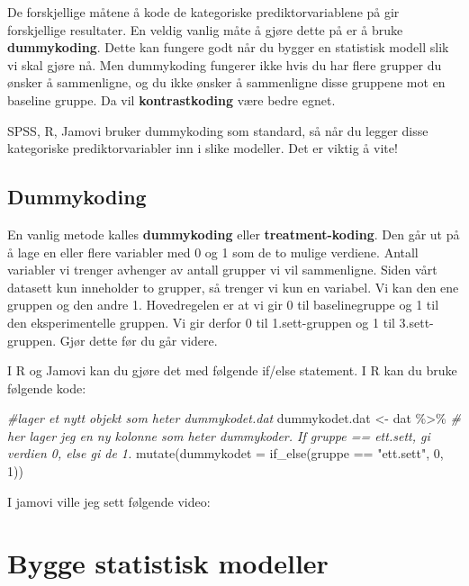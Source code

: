 \documentclass[
]{book}
\newenvironment{Shaded}{\begin{snugshade}}{\end{snugshade}}
\newcommand{\AttributeTok}[1]{\textcolor[rgb]{0.77,0.63,0.00}{#1}}
\newcommand{\CommentTok}[1]{\textcolor[rgb]{0.56,0.35,0.01}{\textit{#1}}}
\newcommand{\DecValTok}[1]{\textcolor[rgb]{0.00,0.00,0.81}{#1}}
\newcommand{\FunctionTok}[1]{\textcolor[rgb]{0.00,0.00,0.00}{#1}}
\newcommand{\NormalTok}[1]{#1}
\newcommand{\OtherTok}[1]{\textcolor[rgb]{0.56,0.35,0.01}{#1}}
\newcommand{\SpecialCharTok}[1]{\textcolor[rgb]{0.00,0.00,0.00}{#1}}
\newcommand{\StringTok}[1]{\textcolor[rgb]{0.31,0.60,0.02}{#1}}
\begin{document}
De forskjellige måtene å kode de kategoriske prediktorvariablene på gir forskjellige resultater. En veldig vanlig måte å gjøre dette på er å bruke \textbf{dummykoding}. Dette kan fungere godt når du bygger en statistisk modell slik vi skal gjøre nå. Men dummykoding fungerer ikke hvis du har flere grupper du ønsker å sammenligne, og du ikke ønsker å sammenligne disse gruppene mot en baseline gruppe. Da vil \textbf{kontrastkoding} være bedre egnet.

SPSS, R, Jamovi bruker dummykoding som standard, så når du legger disse kategoriske prediktorvariabler inn i slike modeller. Det er viktig å vite!

\hypertarget{dummykoding}{%
\section{Dummykoding}\label{dummykoding}}

En vanlig metode kalles \textbf{dummykoding} eller \textbf{treatment-koding}. Den går ut på å lage en eller flere variabler med 0 og 1 som de to mulige verdiene. Antall variabler vi trenger avhenger av antall grupper vi vil sammenligne. Siden vårt datasett kun inneholder to grupper, så trenger vi kun en variabel. Vi kan den ene gruppen og den andre 1. Hovedregelen er at vi gir 0 til baselinegruppe og 1 til den eksperimentelle gruppen. Vi gir derfor 0 til 1.sett-gruppen og 1 til 3.sett-gruppen. Gjør dette før du går videre.

I R og Jamovi kan du gjøre det med følgende if/else statement. I R kan du bruke følgende kode:

\begin{Shaded}
\begin{Highlighting}[]
\CommentTok{\#lager et nytt objekt som heter dummykodet.dat}
\NormalTok{dummykodet.dat }\OtherTok{\textless{}{-}}\NormalTok{ dat }\SpecialCharTok{\%\textgreater{}\%}
  \CommentTok{\# her lager jeg en ny kolonne som heter dummykoder. If gruppe == \textquotesingle{}ett.sett\textquotesingle{}, gi verdien 0, else gi de 1.}
  \FunctionTok{mutate}\NormalTok{(}\AttributeTok{dummykodet =} \FunctionTok{if\_else}\NormalTok{(gruppe }\SpecialCharTok{==} \StringTok{"ett.sett"}\NormalTok{, }\DecValTok{0}\NormalTok{, }\DecValTok{1}\NormalTok{))}
\end{Highlighting}
\end{Shaded}

I jamovi ville jeg sett følgende video:

\hypertarget{bygge-statistisk-modeller}{%
\chapter{Bygge statistisk modeller}\label{bygge-statistisk-modeller}}
\end{document}
